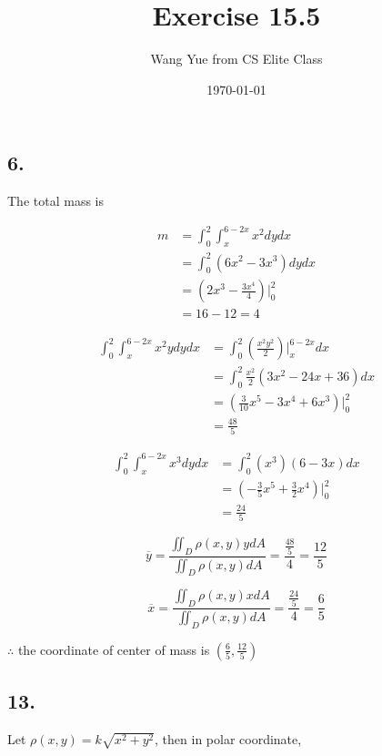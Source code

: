 \documentclass{article}
\begin{document}
  \title{Exercise 15.5}
  \author{Wang Yue from CS Elite Class}
  \date{\today}
  \maketitle

  \subsection*{6. }

  The total mass is

  $$\begin{aligned}
    m &= \int_0^2 \int_{x}^{6-2x} x^2 dy dx \\
    &= \int_0^2 (6x^2 - 3x^3) dy dx \\
    &= (2x^3 - \frac{3x^4}{4})\biggl|_0^2 \\
    &= 16 - 12 = 4
  \end{aligned}$$

  $$\begin{aligned}
    \int_0^2 \int_x^{6-2x} x^2y dy dx &= \int_0^2 (\frac{x^2y^2}{2})\biggl|_{x}^{6-2x} dx \\
    &= \int_0^2 \frac{x^2}{2} (3x^2-24x+36) dx \\
    &= (\frac{3}{10}x^5 - 3x^4 + 6x^3)\biggl|_0^2 \\
    &= \frac{48}{5}
   \end{aligned}$$

   $$\begin{aligned}
     \int_0^2 \int_x^{6-2x} x^3 dy dx &= \int_0^2 (x^3)(6-3x) dx \\
     &= (-\frac{3}{5}x^5 + \frac{3}{2} x^4) \biggl|_0^2 \\
     &= \frac{24}{5}
   \end{aligned}$$

   $$\overline y = \frac{\iint_D \rho(x, y) y dA}{\iint_D \rho(x, y) dA} = \frac{\frac{48}{5}}{4} = \frac{12}{5}$$

   $$\overline x = \frac{\iint_D \rho(x, y) x dA}{\iint_D \rho(x, y) dA} = \frac{\frac{24}{5}}{4} = \frac{6}{5}$$

   $\therefore$ the coordinate of center of mass is $(\frac 6 5, \frac{12}{5})$

  \subsection*{13. }

  Let $\rho(x, y) = k \sqrt{x^2+y^2}$, then in polar coordinate, 
\end{document}
